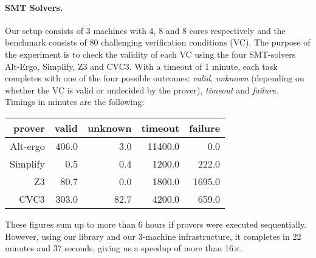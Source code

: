 \documentclass[preprint]{sigplanconf}
\begin{document}
\paragraph{SMT Solvers.}
Our setup consists of 3 machines with 4, 8 and 8 cores
respectively and the benchmark consists of
80 challenging verification conditions (VC).  
The purpose of the experiment is to check the validity of each VC
using the four SMT-solvers Alt-Ergo, Simplify, Z3 and CVC3.
With a timeout of 1 minute, each task completes 
with one of the four possible outcomes: \emph{valid},
\emph{unknown} (depending on
whether the VC is valid or undecided by the prover), 
\emph{timeout} and \emph{failure}.
Timings in minutes are the following:
\begin{center}
  \begin{tabular}{|r||r|r|r|r|}
    \hline
    prover   & valid & unknown & timeout & failure
    \\\hline\hline
    Alt-ergo & 406.0 & 3.0   &  11400.0 & 0.0       
    \\\hline
    Simplify &  0.5   & 0.4   &  1200.0 & 222.0   
    \\\hline
    Z3       & 80.7   & 0.0   &  1800.0 & 1695.0   
    \\\hline
    CVC3     & 303.0  & 82.7  &  4200.0 & 659.0   
    \\\hline
  \end{tabular}
\end{center}
These figures sum up to more than 6 hours if provers were executed
sequentially. However, using our library and our 3-machine
infrastructure, it completes in 22 minutes and 37 seconds, giving us a
speedup of more than 16$\times$. 
\end{document}
